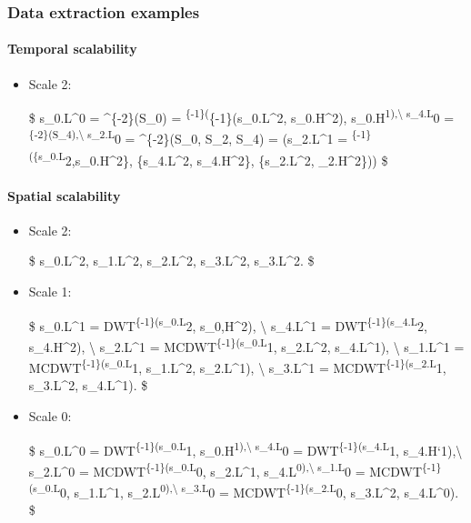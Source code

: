 {\subsubsection{Data extraction examples}
\paragraph{Temporal scalability}
\begin{itemize}
\item
  Scale 2:

  \$ s\_0.L\^{}0 = \^{}\{-2\}(S\_0) =
  \textsuperscript{\{-1\}(}\{-1\}(s\_0.L\^{}2,
  s\_0.H\^{}2), s\_0.H\textsuperscript{1),\textbackslash{} s\_4.L}0 =
  \textsuperscript{\{-2\}(S\_4),\textbackslash{} s\_2.L}0 =
  \^{}\{-2\}(S\_0, S\_2, S\_4) = (s\_2.L\^{}1 =
  \textsuperscript{\{-1\}(\{s\_0.L}2,s\_0.H\^{}2\},
  \{s\_4.L\^{}2, s\_4.H\^{}2\}, \{s\_2.L\^{}2, \_2.H\^{}2\}))
  \$
\end{itemize}

\paragraph{Spatial scalability}
\begin{itemize}
\item
  Scale 2:

  \$ s\_0.L\^{}2, s\_1.L\^{}2, s\_2.L\^{}2, s\_3.L\^{}2, s\_3.L\^{}2. \$
\item
  Scale 1:

  \$ s\_0.L\^{}1 = DWT\textsuperscript{\{-1\}(s\_0.L}2, s\_0,H\^{}2),
  \textbackslash{} s\_4.L\^{}1 = DWT\textsuperscript{\{-1\}(s\_4.L}2,
  s\_4.H\^{}2), \textbackslash{} s\_2.L\^{}1 =
  MCDWT\textsuperscript{\{-1\}(s\_0.L}1, s\_2.L\^{}2, s\_4.L\^{}1),
  \textbackslash{} s\_1.L\^{}1 = MCDWT\textsuperscript{\{-1\}(s\_0.L}1,
  s\_1.L\^{}2, s\_2.L\^{}1), \textbackslash{} s\_3.L\^{}1 =
  MCDWT\textsuperscript{\{-1\}(s\_2.L}1, s\_3.L\^{}2, s\_4.L\^{}1). \$
\item
  Scale 0:

  \$ s\_0.L\^{}0 = DWT\textsuperscript{\{-1\}(s\_0.L}1,
  s\_0.H\textsuperscript{1),\textbackslash{} s\_4.L}0 =
  DWT\textsuperscript{\{-1\}(s\_4.L}1, s\_4.H`1),\textbackslash{}
  s\_2.L\^{}0 = MCDWT\textsuperscript{\{-1\}(s\_0.L}0, s\_2.L\^{}1,
  s\_4.L\textsuperscript{0),\textbackslash{} s\_1.L}0 =
  MCDWT\textsuperscript{\{-1\}(s\_0.L}0, s\_1.L\^{}1,
  s\_2.L\textsuperscript{0),\textbackslash{} s\_3.L}0 =
  MCDWT\textsuperscript{\{-1\}(s\_2.L}0, s\_3.L\^{}2, s\_4.L\^{}0). \$
\end{itemize}

}
